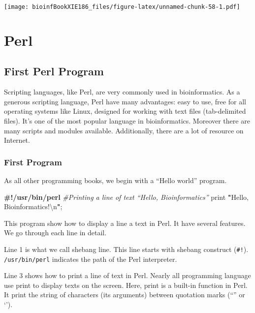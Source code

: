 \documentclass[]{book}
\makeatletter
\newenvironment{Shaded}{\begin{snugshade}}{\end{snugshade}}
\newcommand{\CharTok}[1]{\textcolor[rgb]{0.31,0.60,0.02}{#1}}
\newcommand{\CommentTok}[1]{\textcolor[rgb]{0.56,0.35,0.01}{\textit{#1}}}
\newcommand{\FunctionTok}[1]{\textcolor[rgb]{0.00,0.00,0.00}{#1}}
\newcommand{\KeywordTok}[1]{\textcolor[rgb]{0.13,0.29,0.53}{\textbf{#1}}}
\newcommand{\NormalTok}[1]{#1}
\newcommand{\StringTok}[1]{\textcolor[rgb]{0.31,0.60,0.02}{#1}}
\newenvironment{kframe}{%
\medskip{}
\setlength{\fboxsep}{.8em}
 \def\at@end@of@kframe{}%
 \ifinner\ifhmode%
  \def\at@end@of@kframe{\end{minipage}}%
  \begin{minipage}{\columnwidth}%
 \fi\fi%
 \def\FrameCommand##1{\hskip\@totalleftmargin \hskip-\fboxsep
 \colorbox{shadecolor}{##1}\hskip-\fboxsep
     \hskip-\linewidth \hskip-\@totalleftmargin \hskip\columnwidth}%
 \MakeFramed {\advance\hsize-\width
   \@totalleftmargin\z@ \linewidth\hsize
   \@setminipage}}%
 {\par\unskip\endMakeFramed%
 \at@end@of@kframe}
\renewenvironment{Shaded}{\begin{kframe}}{\end{kframe}}
\makeatother
\begin{document}
\texttt{[image: bioinfBookXIE186\_files/figure-latex/unnamed-chunk-58-1.pdf]}

\hypertarget{part-perl}{%
\part{Perl}\label{part-perl}}

\hypertarget{first-perl-program}{%
\chapter{First Perl Program}\label{first-perl-program}}

Scripting languages, like Perl, are very commonly used in bioinformatics. As a generous scripting language, Perl have many advantages: easy to use, free for all operating systems like Linux, designed for working with text files (tab-delimited files). It's one of the most popular language in bioinformatics. Moreover there are many scripts and modules available. Additionally, there are a lot of resource on Internet.

\hypertarget{first-program}{%
\section{First Program}\label{first-program}}

As all other programming books, we begin with a ``Hello world'' program.

\begin{Shaded}
\begin{Highlighting}[]
\KeywordTok{#!/usr/bin/perl}
\CommentTok{#Printing a line of text “Hello, Bioinformatics”}
\FunctionTok{print} \KeywordTok{"}\StringTok{Hello, Bioinformatics!}\CharTok{\textbackslash{}n}\KeywordTok{"}\NormalTok{;}
\end{Highlighting}
\end{Shaded}

This program show how to display a line a text in Perl. It have several features. We go through each line in detail.

Line 1 is what we call shebang line. This line starts with shebang construct (\texttt{\#!}). \texttt{/usr/bin/perl} indicates the path of the Perl interpreter.

Line 3 shows how to print a line of text in Perl. Nearly all programming language use print to display texts on the screen. Here, print is a built-in function in Perl. It print the string of characters (its arguments) between quotation marks (``'' or `').
\end{document}
